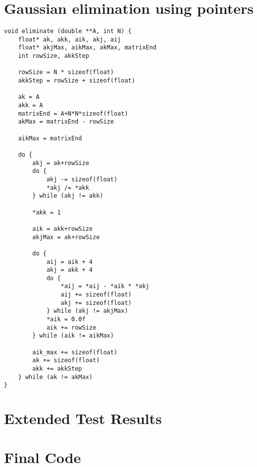 \newpage
\section{Gaussian elimination using pointers}
\label{sec:gaussian_elim_index_c_code}
\begin{verbatim}
void eliminate (double **A, int N) { 
    float* ak, akk, aik, akj, aij
    float* akjMax, aikMax, akMax, matrixEnd
    int rowSize, akkStep
    
    rowSize = N * sizeof(float)
    akkStep = rowSize + sizeof(float)
    
    ak = A
    akk = A
    matrixEnd = A+N*N*sizeof(float)
    akMax = matrixEnd - rowSize
    
    aikMax = matrixEnd
    
    do {
        akj = ak+rowSize
        do {
            akj -= sizeof(float)
            *akj /= *akk
        } while (akj != akk)

        *akk = 1
        
        aik = akk+rowSize
        akjMax = ak+rowSize
        
        do {
            aij = aik + 4
            akj = akk + 4
            do {
                *aij = *aij - *aik * *akj
                aij += sizeof(float)
                akj += sizeof(float)
            } while (akj != akjMax)
            *aik = 0.0f
            aik += rowSize
        } while (aik != aikMax)
            
        aik_max += sizeof(float)
        ak += sizeof(float)
        akk += akkStep
    } while (ak != akMax)
}
\end{verbatim}

\newpage
\section{Extended Test Results}
\label{sec:full_stats}
\begin{figure}[H]
    
\end{figure}

\newpage
\tiny
\section{Final Code}
\label{sec:final_code}

